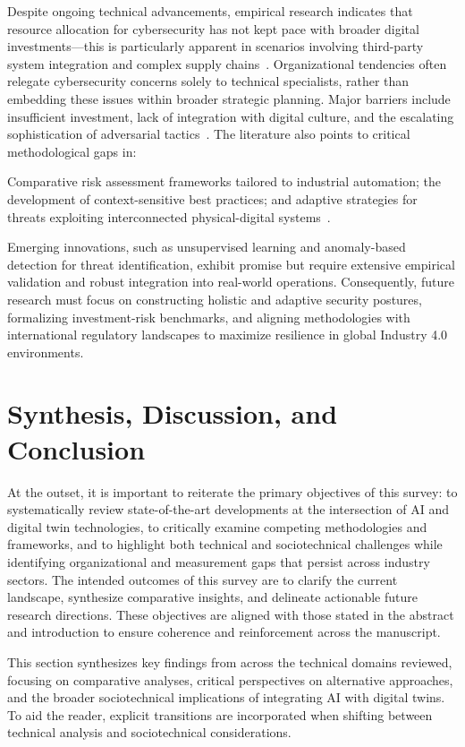 \documentclass[sigconf]{acmart}
\begin{document}
Despite ongoing technical advancements, empirical research indicates that resource allocation for cybersecurity has not kept pace with broader digital investments—this is particularly apparent in scenarios involving third-party system integration and complex supply chains~\cite{ref35}. Organizational tendencies often relegate cybersecurity concerns solely to technical specialists, rather than embedding these issues within broader strategic planning. Major barriers include insufficient investment, lack of integration with digital culture, and the escalating sophistication of adversarial tactics~\cite{ref35}. The literature also points to critical methodological gaps in:

Comparative risk assessment frameworks tailored to industrial automation; the development of context-sensitive best practices; and adaptive strategies for threats exploiting interconnected physical-digital systems~\cite{ref10}.

Emerging innovations, such as unsupervised learning and anomaly-based detection for threat identification, exhibit promise but require extensive empirical validation and robust integration into real-world operations. Consequently, future research must focus on constructing holistic and adaptive security postures, formalizing investment-risk benchmarks, and aligning methodologies with international regulatory landscapes to maximize resilience in global Industry 4.0 environments.

\section{Synthesis, Discussion, and Conclusion}

At the outset, it is important to reiterate the primary objectives of this survey: to systematically review state-of-the-art developments at the intersection of AI and digital twin technologies, to critically examine competing methodologies and frameworks, and to highlight both technical and sociotechnical challenges while identifying organizational and measurement gaps that persist across industry sectors. The intended outcomes of this survey are to clarify the current landscape, synthesize comparative insights, and delineate actionable future research directions. These objectives are aligned with those stated in the abstract and introduction to ensure coherence and reinforcement across the manuscript.

This section synthesizes key findings from across the technical domains reviewed, focusing on comparative analyses, critical perspectives on alternative approaches, and the broader sociotechnical implications of integrating AI with digital twins. To aid the reader, explicit transitions are incorporated when shifting between technical analysis and sociotechnical considerations.
\end{document}
